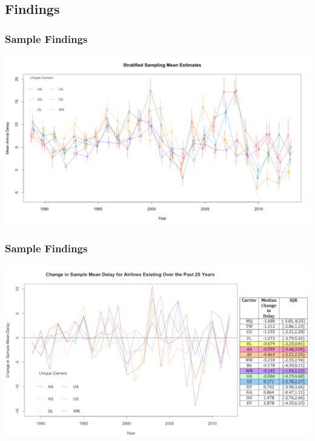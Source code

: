 \documentclass{beamer}
\begin{document}
\subsection{Findings}
\begin{frame}
\frametitle{Sample Findings}
\begin{center} 
\includegraphics[width=1 \textwidth]{stratSampWithSE}
\end{center}

\end{frame}

\begin{frame}
\frametitle{Sample Findings}
\begin{center} 
\includegraphics[width=1 \textwidth]{summarySamp}
\end{center}

\end{frame}
\end{document}
